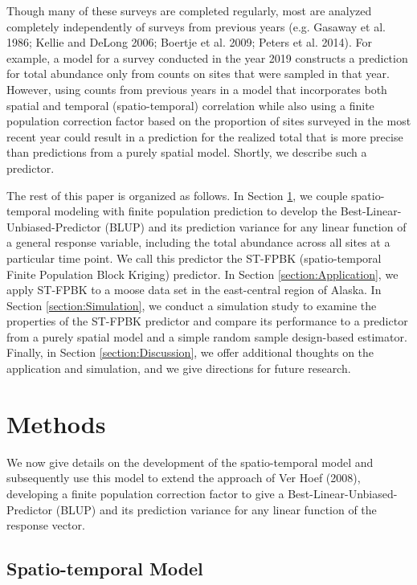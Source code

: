\documentclass[]{article}    %
\begin{document}
Though many of these surveys are completed regularly, most are analyzed
completely independently of surveys from previous years (e.g. Gasaway et
al. 1986; Kellie and DeLong 2006; Boertje et al. 2009; Peters et al.
2014). For example, a model for a survey conducted in the year 2019
constructs a prediction for total abundance only from counts on sites
that were sampled in that year. However, using counts from previous
years in a model that incorporates both spatial and temporal
(spatio-temporal) correlation while also using a finite population
correction factor based on the proportion of sites surveyed in the most
recent year could result in a prediction for the realized total that is
more precise than predictions from a purely spatial model. Shortly, we
describe such a predictor.

The rest of this paper is organized as follows. In Section
\ref{section:Methods}, we couple spatio-temporal modeling with finite
population prediction to develop the Best-Linear-Unbiased-Predictor
(BLUP) and its prediction variance for any linear function of a general
response variable, including the total abundance across all sites at a
particular time point. We call this predictor the ST-FPBK
(spatio-temporal Finite Population Block Kriging) predictor. In Section
\ref{section:Application}, we apply ST-FPBK to a moose data set in the
east-central region of Alaska. In Section \ref{section:Simulation}, we
conduct a simulation study to examine the properties of the ST-FPBK
predictor and compare its performance to a predictor from a purely
spatial model and a simple random sample design-based estimator.
Finally, in Section \ref{section:Discussion}, we offer additional
thoughts on the application and simulation, and we give directions for
future research.

\hypertarget{section:Methods}{%
\section{Methods}\label{section:Methods}}

We now give details on the development of the spatio-temporal model and
subsequently use this model to extend the approach of Ver Hoef (2008),
developing a finite population correction factor to give a
Best-Linear-Unbiased-Predictor (BLUP) and its prediction variance for
any linear function of the response vector.

\hypertarget{spatio-temporal-model}{%
\subsection{Spatio-temporal Model}\label{spatio-temporal-model}}
\end{document}
